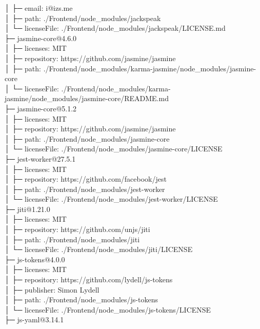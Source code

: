 \documentclass[
    paper=a4,
    twoside=false,
    parskip=half,
    listof=entryprefix,
    listof=totoc,
    index=totoc,
    bibliography=totoc,
    headsepline,
]{scrbook}
\begin{document}
    │  ├─ email: i@izs.me\\
    │  ├─ path: ./Frontend/node\_modules/jackspeak\\
    │  └─ licenseFile: ./Frontend/node\_modules/jackspeak/LICENSE.md\\
    ├─ jasmine-core@4.6.0\\
    │  ├─ licenses: MIT\\
    │  ├─ repository: https://github.com/jasmine/jasmine\\
    │  ├─ path: ./Frontend/node\_modules/karma-jasmine/node\_modules/jasmine-core\\
    │  └─ licenseFile: ./Frontend/node\_modules/karma-jasmine/node\_modules/jasmine-core/README.md\\
    ├─ jasmine-core@5.1.2\\
    │  ├─ licenses: MIT\\
    │  ├─ repository: https://github.com/jasmine/jasmine\\
    │  ├─ path: ./Frontend/node\_modules/jasmine-core\\
    │  └─ licenseFile: ./Frontend/node\_modules/jasmine-core/LICENSE\\
    ├─ jest-worker@27.5.1\\
    │  ├─ licenses: MIT\\
    │  ├─ repository: https://github.com/facebook/jest\\
    │  ├─ path: ./Frontend/node\_modules/jest-worker\\
    │  └─ licenseFile: ./Frontend/node\_modules/jest-worker/LICENSE\\
    ├─ jiti@1.21.0\\
    │  ├─ licenses: MIT\\
    │  ├─ repository: https://github.com/unjs/jiti\\
    │  ├─ path: ./Frontend/node\_modules/jiti\\
    │  └─ licenseFile: ./Frontend/node\_modules/jiti/LICENSE\\
    ├─ js-tokens@4.0.0\\
    │  ├─ licenses: MIT\\
    │  ├─ repository: https://github.com/lydell/js-tokens\\
    │  ├─ publisher: Simon Lydell\\
    │  ├─ path: ./Frontend/node\_modules/js-tokens\\
    │  └─ licenseFile: ./Frontend/node\_modules/js-tokens/LICENSE\\
    ├─ js-yaml@3.14.1\\
\end{document}
